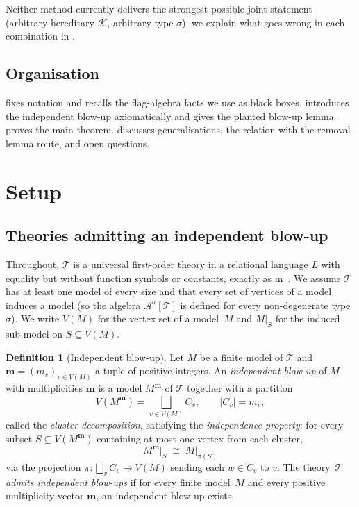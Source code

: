 \documentclass[11pt]{article}
\theoremstyle{definition}
\newtheorem{definition}[theorem]{Definition}
\newcommand{\A}{\mathcal{A}}
\newcommand{\K}{\mathcal{K}}
\newcommand{\T}{\mathcal{T}}
\newcommand{\bvec}{\mathbf{m}}
\begin{document}
Neither method currently delivers the strongest possible joint statement
(arbitrary hereditary $\K$, arbitrary type $\sigma$); we explain what
goes wrong in each combination in .

\subsection{Organisation}

 fixes notation and recalls the flag-algebra facts we
use as black boxes.   introduces the independent
blow-up axiomatically and gives the planted blow-up lemma.
 proves the main theorem.  
discusses generalisations, the relation with the removal-lemma route,
and open questions.

\section{Setup}\label{sec:setup}

\subsection{Theories admitting an independent blow-up}

Throughout, $\T$ is a universal first-order theory in a relational
language $L$ with equality but without function symbols or constants,
exactly as in~\cite[\S2]{Razborov2007}.  We assume $\T$ has at least one
model of every size and that every set of vertices of a model induces a
model (so the algebra $\A^\sigma[\T]$ is defined for every
non-degenerate type $\sigma$).  We write $V(M)$ for the vertex set of a
model~$M$ and $M\vert_S$ for the induced sub-model on $S\subseteq V(M)$.

\begin{definition}[Independent blow-up]\label{def:blow-up}
Let $M$ be a finite model of $\T$ and $\bvec=(m_v)_{v\in V(M)}$ a tuple
of positive integers.  An \emph{independent blow-up} of $M$ with
multiplicities $\bvec$ is a model $M^{\bvec}$ of $\T$ together with a
partition
\[
  V(M^{\bvec})=\bigsqcup_{v\in V(M)} C_v,
  \qquad |C_v|=m_v,
\]
called the \emph{cluster decomposition}, satisfying the
\emph{independence property}: for every subset
$S\subseteq V(M^{\bvec})$ containing at most one vertex from each cluster,
\[
  M^{\bvec}\bigl\vert_S \;\cong\; M\bigl\vert_{\pi(S)}
\]
via the projection $\pi\colon\bigsqcup_v C_v\to V(M)$ sending each
$w\in C_v$ to $v$.  The theory~$\T$ \emph{admits independent blow-ups} if
for every finite model~$M$ and every positive multiplicity vector
$\bvec$, an independent blow-up exists.
\end{definition}
\end{document}
